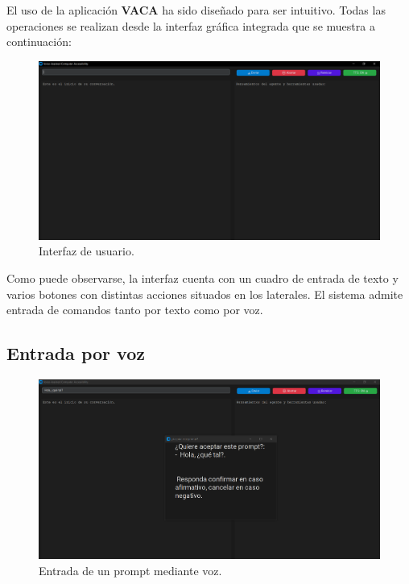 El uso de la aplicación \textbf{VACA} ha sido diseñado para ser intuitivo. Todas las operaciones se realizan desde la interfaz gráfica integrada que se muestra a continuación:

\begin{figure}[h!]
\centering
\includegraphics[scale=0.35]{img/interfaz.png}
\caption{Interfaz de usuario.}
\label{fig:manual_interfaz}
\end{figure}

Como puede observarse, la interfaz cuenta con un cuadro de entrada de texto y varios botones con distintas acciones situados en los laterales. El sistema admite entrada de comandos tanto por texto como por voz.

\subsection{Entrada por voz}

\begin{figure}[h!]
\centering
\includegraphics[scale=0.35]{img/input_voz.png}
\caption{Entrada de un prompt mediante voz.}
\label{fig:input_voz}
\end{figure}

